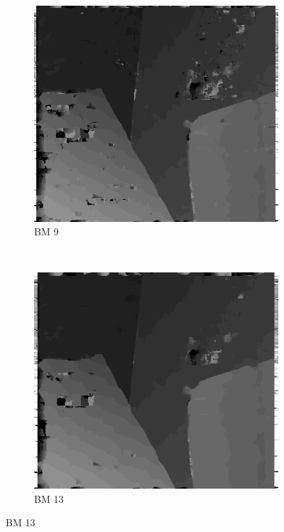 \begin{figure}
  \begin{subfigure}[b]{0.23\textwidth}
    \centering
    \includegraphics[width=\textwidth]{images/stereo-pairs/venus_bm_9.png}
    \caption{BM 9}
  \end{subfigure}
  ~
  \begin{subfigure}[b]{0.23\textwidth}
    \centering
    \includegraphics[width=\textwidth]{images/stereo-pairs/venus_bm_13.png}
    \caption{BM 13}

\end{subfigure}
\end{figure}
